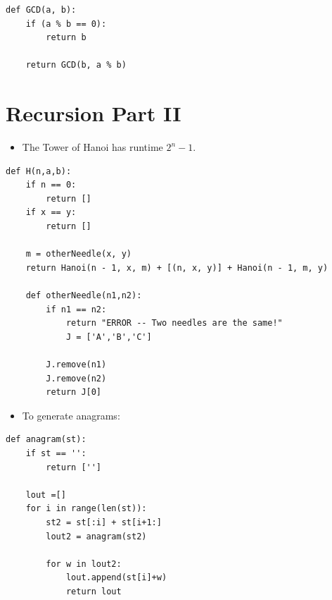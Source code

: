 \documentclass[12pt]{scrartcl}
\begin{document}
\begin{lstlisting}
def GCD(a, b):
    if (a % b == 0):
        return b

    return GCD(b, a % b)
\end{lstlisting}

\section{Recursion Part II}
\begin{itemize}
    \item The Tower of Hanoi has runtime $2^n - 1$.
\end{itemize}

\begin{lstlisting}
def H(n,a,b):
    if n == 0:
        return []
    if x == y:
        return []

    m = otherNeedle(x, y)
    return Hanoi(n - 1, x, m) + [(n, x, y)] + Hanoi(n - 1, m, y)

    def otherNeedle(n1,n2):
        if n1 == n2:
            return "ERROR -- Two needles are the same!"
            J = ['A','B','C']

        J.remove(n1)
        J.remove(n2)
        return J[0]
\end{lstlisting}

\begin{itemize}
    \item To generate anagrams:
\end{itemize}

\begin{lstlisting}
def anagram(st):
    if st == '':
        return ['']

    lout =[]
    for i in range(len(st)):
        st2 = st[:i] + st[i+1:]
        lout2 = anagram(st2)

        for w in lout2:
            lout.append(st[i]+w)
            return lout
\end{lstlisting}
\end{document}
